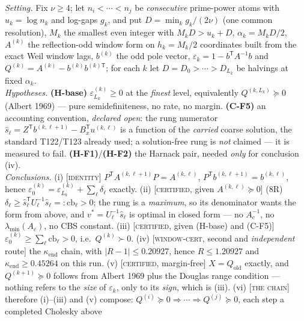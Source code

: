 \documentclass[11pt,a4paper]{article}
\begin{document}
\begin{keybox}
\emph{Setting.} Fix $\nu\ge4$; let $n_i<\cdots<n_j$ be \emph{consecutive} prime-power atoms with
$u_k=\log n_k$ and log-gaps $g_k$, and put $D=\min_kg_k/(2\nu)$ (one common resolution), $M_k$ the
smallest even integer with $M_kD>u_k+D$, $\alpha_k=M_kD/2$, $A^{(k)}$ the reflection-odd window form
on $h_k=M_k/2$ coordinates built from the exact Weil window lags, $b^{(k)}$ the odd pole vector,
$\varepsilon_k=1-b^{\mathsf T}A^{-1}b$ and $Q^{(k)}=A^{(k)}-b^{(k)}b^{(k)\mathsf T}$; for each $k$
let $D=D_0>\cdots>D_{L_k}$ be halvings at fixed $\alpha_k$.\\[3pt]
\emph{Hypotheses.} \textbf{(H-base)} $\varepsilon^{(k)}_{L_k}\ge0$ at the \emph{finest} level,
equivalently $Q^{(k,L_k)}\succeq0$ (Albert 1969) --- pure semidefiniteness, no rate, no margin.
\textbf{(C-F5)} an accounting convention, \emph{declared open}: the rung numerator
$\hat s_\ell=Z^{\mathsf T}b^{(k,\ell+1)}-B_x^{\mathsf T}u^{(k,\ell)}$ is a function of the
\emph{carried} coarse solution, the standard T122/T123 already used; a solution-free rung is
\emph{not} claimed --- it is measured to fail. \textbf{(H-F1)}/\textbf{(H-F2)} the Harnack pair,
needed \emph{only} for conclusion (iv).\\[3pt]
\emph{Conclusions.} (i) [\textsc{identity}] $P^{\mathsf T}A^{(k,\ell+1)}P=A^{(k,\ell)}$,
$P^{\mathsf T}b^{(k,\ell+1)}=b^{(k,\ell)}$, hence
$\varepsilon^{(k)}_0=\varepsilon^{(k)}_{L_k}+\sum_\ell\delta_\ell$ exactly.
(ii) [\textsc{certified}, given $A^{(k,\ell)}\succeq0$] (8R)
$\delta_\ell\ge\hat s_\ell^{\mathsf T}U_\ell^{-1}\hat s_\ell=:\mathrm{cb}_\ell>0$; the rung is a
\emph{maximum}, so its denominator wants the form from above, and $v^*=U_\ell^{-1}\hat s_\ell$ is
optimal in closed form --- no $A_c^{-1}$, no $\lambda_{\min}(A_c)$, no CBS constant.
(iii) [\textsc{certified}, given (H-base) and (C-F5)]
$\varepsilon^{(k)}_0\ge\sum_\ell\mathrm{cb}_\ell>0$, i.e.\ $Q^{(k)}\succ0$.
(iv) [\textsc{window-cert}, second and \emph{independent} route] the $\kappa_{\mathrm{end}}$ chain,
with $|R-1|\le0.20927$, hence $R\le1.20927$ and $\kappa_{\mathrm{end}}\ge0.45264$ on this run.
(v) [\textsc{certified}, margin-free] $X=Q_{\mathrm{old}}$ exactly, and $Q^{(k+1)}\succeq0$ follows
from Albert 1969 plus the Douglas range condition --- nothing refers to the \emph{size} of
$\varepsilon_k$, only to its \emph{sign}, which is (iii).
(vi) [\textsc{the chain}] therefore (i)--(iii) and (v) compose:
$Q^{(i)}\succeq0\Rightarrow\cdots\Rightarrow Q^{(j)}\succeq0$, each step a completed Cholesky above

\end{keybox}
\end{document}
